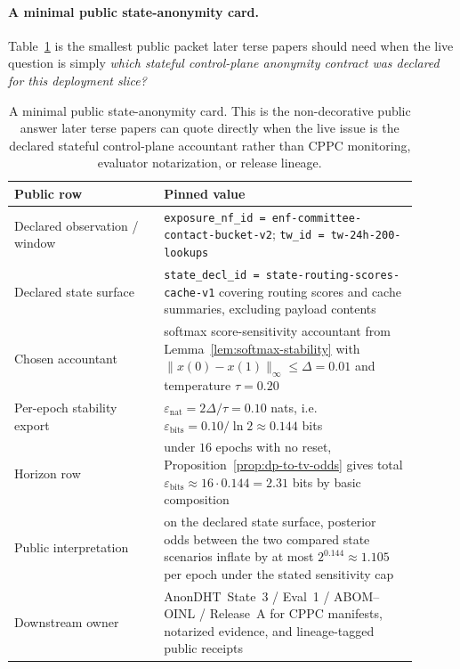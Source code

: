 \documentclass[11pt]{article}
\begin{document}
\paragraph{A minimal public state-anonymity card.}
Table~\ref{tab:minimal-state-anonymity-card} is the smallest public packet later terse papers should need when the live question is simply \emph{which stateful control-plane anonymity contract was declared for this deployment slice?}

\begin{table}[t]
\centering
\small
\begin{tabular}{@{}p{0.33\linewidth}p{0.57\linewidth}@{}}
\toprule
\textbf{Public row} & \textbf{Pinned value}\\
\midrule
Declared observation / window & \texttt{exposure\_nf\_id = enf-committee-contact-bucket-v2}; \texttt{tw\_id = tw-24h-200-lookups} \\
Declared state surface & \texttt{state\_decl\_id = state-routing-scores-cache-v1} covering routing scores and cache summaries, excluding payload contents \\
Chosen accountant & softmax score-sensitivity accountant from Lemma~\ref{lem:softmax-stability} with $\|x(0)-x(1)\|_\infty \le \Delta = 0.01$ and temperature $\tau = 0.20$ \\
Per-epoch stability export & $\varepsilon_{\mathrm{nat}} = 2\Delta/\tau = 0.10$ nats, i.e. $\varepsilon_{\mathrm{bits}} = 0.10/\ln 2 \approx 0.144$ bits \\
Horizon row & under $16$ epochs with no reset, Proposition~\ref{prop:dp-to-tv-odds} gives total $\varepsilon_{\mathrm{bits}} \approx 16\cdot 0.144 = 2.31$ bits by basic composition \\
Public interpretation & on the declared state surface, posterior odds between the two compared state scenarios inflate by at most $2^{0.144} \approx 1.105$ per epoch under the stated sensitivity cap \\
Downstream owner & AnonDHT~State~3 / Eval~1 / ABOM--OINL / Release~A for CPPC manifests, notarized evidence, and lineage-tagged public receipts \\
\bottomrule
\end{tabular}
\caption{A minimal public state-anonymity card. This is the non-decorative public answer later terse papers can quote directly when the live issue is the declared stateful control-plane accountant rather than CPPC monitoring, evaluator notarization, or release lineage.}
\label{tab:minimal-state-anonymity-card}
\end{table}
\end{document}
